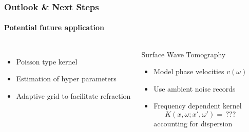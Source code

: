 \documentclass[aspectratio=169, t, 10pt, ]{beamer}
\begin{document}
\begin{frame}
    \frametitle{Outlook \& Next Steps }
    \framesubtitle{Potential future application}

\begin{columns}
%

    \begin{itemize}
        \item Poisson type kernel
        \item Estimation of hyper parameters
        \item Adaptive grid to facilitate refraction
    \end{itemize}

    \begin{block}{Surface Wave Tomography}
        \begin{itemize}
            \item Model phase velocities $v(\omega)$
            \item Use ambient noise records
            \item Frequency dependent kernel
                \begin{equation}
                    K(x,\omega; x', \omega') = \, ???
                \end{equation}
                accounting for dispersion
        \end{itemize}
    \end{block}


\end{columns}
\end{frame}
\end{document}
